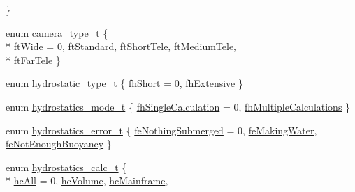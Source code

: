 \begin{DoxyCompactItemize}
 \}
\item 
enum \hyperlink{namespaceShipCAD_a58f51ebd2e66de5e41c2ffd6f434241e}{camera\+\_\+type\+\_\+t} \{ \\*
\hyperlink{namespaceShipCAD_a58f51ebd2e66de5e41c2ffd6f434241ea8dd7ff1f55f46fc3db3ca743a05d93af}{ft\+Wide} = 0, 
\hyperlink{namespaceShipCAD_a58f51ebd2e66de5e41c2ffd6f434241eaa4100f3d3073015697dd72390b55fa44}{ft\+Standard}, 
\hyperlink{namespaceShipCAD_a58f51ebd2e66de5e41c2ffd6f434241ea6f6aa44840629968cfa9815da646a9d0}{ft\+Short\+Tele}, 
\hyperlink{namespaceShipCAD_a58f51ebd2e66de5e41c2ffd6f434241eae0b0ae77e52d05ac3800353808e16afe}{ft\+Medium\+Tele}, 
\\*
\hyperlink{namespaceShipCAD_a58f51ebd2e66de5e41c2ffd6f434241ea849a215bd25942bb9594c0389614fafe}{ft\+Far\+Tele}
 \}
\item 
enum \hyperlink{namespaceShipCAD_afea51c7ee52940acebde29bf44206fe2}{hydrostatic\+\_\+type\+\_\+t} \{ \hyperlink{namespaceShipCAD_afea51c7ee52940acebde29bf44206fe2acfe164530006cd2d42457ec37a0ac24b}{fh\+Short} = 0, 
\hyperlink{namespaceShipCAD_afea51c7ee52940acebde29bf44206fe2affd22dfa116c9ea2aae175feba432961}{fh\+Extensive}
 \}
\item 
enum \hyperlink{namespaceShipCAD_a2c84d37615dd30be37ed0253501fb9a3}{hydrostatics\+\_\+mode\+\_\+t} \{ \hyperlink{namespaceShipCAD_a2c84d37615dd30be37ed0253501fb9a3ab322857f69d00b378f611acbb12bc663}{fh\+Single\+Calculation} = 0, 
\hyperlink{namespaceShipCAD_a2c84d37615dd30be37ed0253501fb9a3aee242838cf07c1950c914a44851804b5}{fh\+Multiple\+Calculations}
 \}
\item 
enum \hyperlink{namespaceShipCAD_a1d801b982c24bce0cf10ffd4b995dda0}{hydrostatics\+\_\+error\+\_\+t} \{ \hyperlink{namespaceShipCAD_a1d801b982c24bce0cf10ffd4b995dda0a0813d6e8a63bd1d17941b321715da4dd}{fe\+Nothing\+Submerged} = 0, 
\hyperlink{namespaceShipCAD_a1d801b982c24bce0cf10ffd4b995dda0ab5378e2d38e12b21bcb9f89b4da7a024}{fe\+Making\+Water}, 
\hyperlink{namespaceShipCAD_a1d801b982c24bce0cf10ffd4b995dda0aabbfd93b3daf55e537540d8d4ac8eb0c}{fe\+Not\+Enough\+Buoyancy}
 \}
\item 
enum \hyperlink{namespaceShipCAD_ac9ff7fc96a52fceafa83edc0d5d06fce}{hydrostatics\+\_\+calc\+\_\+t} \{ \\*
\hyperlink{namespaceShipCAD_ac9ff7fc96a52fceafa83edc0d5d06fcea286a6df9f1d51b98fcbb54f17fbe94d6}{hc\+All} = 0, 
\hyperlink{namespaceShipCAD_ac9ff7fc96a52fceafa83edc0d5d06fcea10c43915dd92febe1ef5328644ea2c11}{hc\+Volume}, 
\hyperlink{namespaceShipCAD_ac9ff7fc96a52fceafa83edc0d5d06fceafb6824df148d1417a4db618e6b4dc4f6}{hc\+Mainframe}, 

\end{DoxyCompactItemize}
